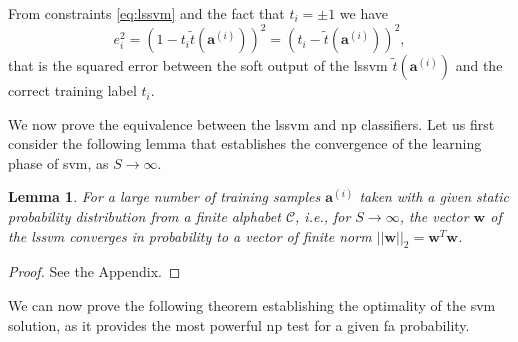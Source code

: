 \documentclass[draftcls,onecolumn,12pt]{IEEEtran}
\newtheorem{lemma}{Lemma}
\begin{document}
From  constraints  \eqref{eq:lssvm} and the fact that $t_i = \pm 1$ we have
\begin{equation}
\label{eq:els}
e_i^2 = (1 - t_i\tilde{t}(\bm{a}^{(i)}) )^2 = (t_i - \tilde{t}(\bm{a}^{(i)}))^2,
\end{equation}
that is the squared error between the soft output of the \ac{lssvm} $\tilde{t}(\bm{a}^{(i)})$ and the correct training label $t_i$.

We now prove the equivalence between the \ac{lssvm} and \ac{np} classifiers. Let us first consider the following lemma that establishes the convergence of the learning phase of \ac{svm}, as $S\rightarrow \infty$.

\begin{lemma}
	\label{lem:lem1}
	For a large number of training samples $\bm{a}^{(i)}$ taken with a given static probability distribution from a finite alphabet $\mathcal C$, i.e., for $S \rightarrow \infty$, the vector $\bm{w}$ of the \ac{lssvm} converges in probability to a vector of finite norm $||\bm{w}||_2 = \bm{w}^T\bm{w}$.
\end{lemma}

\begin{proof}
See the Appendix.
\end{proof}
 
We can now prove the following theorem establishing the optimality of the \ac{svm} solution, as it provides the most powerful \ac{np} test for a given \ac{fa} probability.
\end{document}
